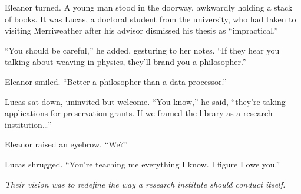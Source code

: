 Eleanor turned. A young man stood in the doorway, awkwardly holding a stack of books. It was Lucas, a doctoral student from the university, who had taken to visiting Merriweather after his advisor dismissed his thesis as “impractical.”

“You should be careful,” he added, gesturing to her notes. “If they hear you talking about weaving in physics, they’ll brand you a philosopher.”

Eleanor smiled. “Better a philosopher than a data processor.”

Lucas sat down, uninvited but welcome. “You know,” he said, “they’re taking applications for preservation grants. If we framed the library as a research institution…”

Eleanor raised an eyebrow. “We?”

Lucas shrugged. “You’re teaching me everything I know. I figure I owe you.”
 

\centerline{\textit{Their vision was to redefine the way a research institute should conduct itself.\\}}


